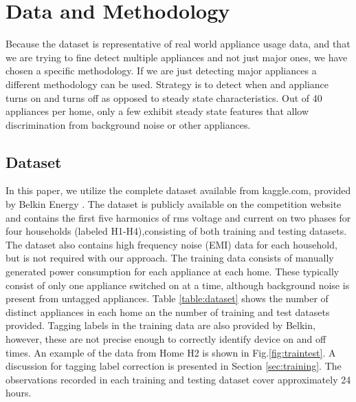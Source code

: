 \documentclass[conference]{IEEEtran}
\begin{document}
\section{Data and Methodology}\label{sec:dataMethod}



Because the dataset is representative of real world appliance usage data, and that we are trying to fine detect multiple appliances and not just major ones, we have chosen a specific methodology.  If we are just detecting major appliances a different methodology can be used.  Strategy is to detect when and appliance turns on and turns off as opposed to steady state characteristics.  Out of 40 appliances per home, only a few exhibit steady state features that allow discrimination from background noise or other appliances.  

\subsection{Dataset}

In this paper, we utilize the complete dataset available from kaggle.com, provided by Belkin Energy \cite{Kaggle}.  The dataset is publicly available on the competition website and contains the first five harmonics of rms voltage and current on two phases for four households (labeled H1-H4),consisting of both training and testing datasets.  The dataset also contains high frequency noise (EMI) data for each household, but is not required with our approach. The training data consists of manually generated power consumption for each appliance at each home.  These typically consist of only one appliance switched on at a time, although background noise is present from untagged appliances.  Table \ref{table:dataset} shows the number of distinct appliances in each home an the number of training and test datasets provided.  Tagging labels in the training data are also provided by Belkin, however, these are not precise enough to correctly identify device on and off times. An example of the data from Home H2 is shown in Fig.\ref{fig:traintest}.  A discussion for tagging label correction is presented in Section \ref{sec:training}.   The observations recorded in each training and testing dataset cover approximately 24 hours.  
\end{document}
